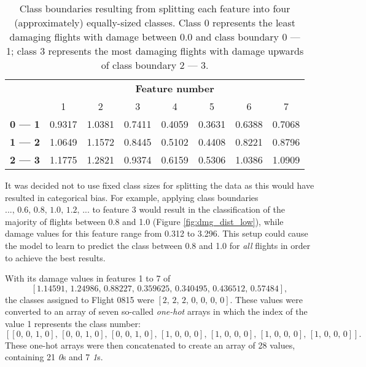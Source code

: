 \begin{table}
    \begin{center}
        \caption{\label{tab:tsc_boundaries} Class boundaries resulting from splitting each feature into four (approximately) equally-sized classes. Class 0 represents the least damaging flights with damage between 0.0 and class boundary 0 --- 1; class 3 represents the most damaging flights with damage upwards of class boundary 2 --- 3.}
        \begin{tabular}{ >{\bfseries}c c c c c c c c }
            \multirow{2}{*}{\textbf{Class boundary}} & \multicolumn{7}{c}{\textbf{Feature number}} \\
             & 1 & 2 & 3 & 4 & 5 & 6 & 7 \\
            \midrule
            0 --- 1 & 0.9317 & 1.0381 & 0.7411 & 0.4059 & 0.3631 & 0.6388 & 0.7068 \\
            1 --- 2 & 1.0649 & 1.1572 & 0.8445 & 0.5102 & 0.4408 & 0.8221 & 0.8796 \\
            2 --- 3 & 1.1775 & 1.2821 & 0.9374 & 0.6159 & 0.5306 & 1.0386 & 1.0909 \\
        \end{tabular}
    \end{center}
\end{table}

It was decided not to use fixed class sizes for splitting the data as this would have resulted in categorical bias. For example, applying class boundaries \(...,\,0.6,\,0.8,\,1.0,\,1.2,\,...\) to feature 3 would result in the classification of the majority of flights between 0.8 and 1.0 (Figure \ref{fig:dmg_dist_low}), while damage values for this feature range from 0.312 to 3.296. This setup could cause the model to learn to predict the class between 0.8 and 1.0 for \textit{all} flights in order to achieve the best results.

With its damage values in features 1 to 7 of
\[
    \left[1.14591,\,1.24986,\,0.88227,\,0.359625,\,0.340495,\,0.436512,\,0.57484\right],
\]
the classes assigned to Flight 0815 were \(\left[2,\,2,\,2,\,0,\,0,\,0,\,0\right]\). These values were converted to an array of seven so-called \textit{one-hot} arrays in which the index of the value 1 represents the class number:
\[
    \left[ \left[ 0,\,0,\,1,\,0 \right],\,\left[ 0,\,0,\,1,\,0 \right],\,\left[ 0,\,0,\,1,\,0 \right],\,\left[ 1,\,0,\,0,\,0 \right],\,\left[ 1,\,0,\,0,\,0 \right],\,\left[ 1,\,0,\,0,\,0 \right],\,\left[ 1,\,0,\,0,\,0 \right]\right].
\]
These one-hot arrays were then concatenated to create an array of 28 values, containing 21 \textit{0}s and 7 \textit{1}s.

